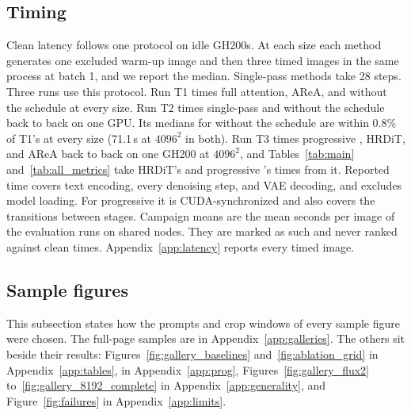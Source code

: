 \subsection{Timing}
\label{app:timing}

Clean latency follows one protocol on idle GH200s. At each size each method generates one excluded warm-up image and then three timed images in the same process at batch 1, and we report the median. Single-pass methods take 28 steps. Three runs use this protocol. Run T1 times full attention, AReA, and \sca{} without the schedule at every size. Run T2 times single-pass \sca{} and \sca{} without the schedule back to back on one GPU. Its medians for \sca{} without the schedule are within 0.8\% of T1's at every size (71.1\,s at $4096^2$ in both). Run T3 times progressive \sca{}, HRDiT, and AReA back to back on one GH200 at $4096^2$, and Tables~\ref{tab:main} and~\ref{tab:all_metrics} take HRDiT's and progressive \sca{}'s times from it. Reported time covers text encoding, every denoising step, and VAE decoding, and excludes model loading. For progressive \sca{} it is CUDA-synchronized and also covers the transitions between stages. Campaign means are the mean seconds per image of the evaluation runs on shared nodes. They are marked as such and never ranked against clean times. Appendix~\ref{app:latency} reports every timed image.

\subsection{Sample figures}
\label{app:samples}

This subsection states how the prompts and crop windows of every sample figure were chosen. The full-page samples are in Appendix~\ref{app:galleries}. The others sit beside their results: Figures~\ref{fig:gallery_baselines} and~\ref{fig:ablation_grid} in Appendix~\ref{app:tables},  in Appendix~\ref{app:prog}, Figures~\ref{fig:gallery_flux2} to~\ref{fig:gallery_8192_complete} in Appendix~\ref{app:generality}, and Figure~\ref{fig:failures} in Appendix~\ref{app:limits}.

